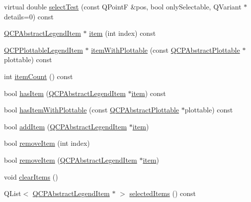 \begin{DoxyCompactItemize}
\item 
virtual double \hyperlink{classQCPLegend_aa3892801051bc7b985e003576df844db}{select\+Test} (const Q\+PointF \&pos, bool only\+Selectable, Q\+Variant $\ast$details=0) const 
\item 
\hyperlink{classQCPAbstractLegendItem}{Q\+C\+P\+Abstract\+Legend\+Item} $\ast$ \hyperlink{classQCPLegend_a454272d7094437beb3278a2294006da5}{item} (int index) const 
\item 
\hyperlink{classQCPPlottableLegendItem}{Q\+C\+P\+Plottable\+Legend\+Item} $\ast$ \hyperlink{classQCPLegend_a5ee80cf83f65e3b6dd386942ee3cc1ee}{item\+With\+Plottable} (const \hyperlink{classQCPAbstractPlottable}{Q\+C\+P\+Abstract\+Plottable} $\ast$plottable) const 
\item 
int \hyperlink{classQCPLegend_a198228e9cdc78d3a3c306fa6763d0404}{item\+Count} () const 
\item 
bool \hyperlink{classQCPLegend_a380dd19eb631592e1ebb9b24cc5b398a}{has\+Item} (\hyperlink{classQCPAbstractLegendItem}{Q\+C\+P\+Abstract\+Legend\+Item} $\ast$\hyperlink{classQCPLegend_a454272d7094437beb3278a2294006da5}{item}) const 
\item 
bool \hyperlink{classQCPLegend_a2eb1d24bdf5658e64962a656303fd61a}{has\+Item\+With\+Plottable} (const \hyperlink{classQCPAbstractPlottable}{Q\+C\+P\+Abstract\+Plottable} $\ast$plottable) const 
\item 
bool \hyperlink{classQCPLegend_a3ab274de52d2951faea45a6d975e6b3f}{add\+Item} (\hyperlink{classQCPAbstractLegendItem}{Q\+C\+P\+Abstract\+Legend\+Item} $\ast$\hyperlink{classQCPLegend_a454272d7094437beb3278a2294006da5}{item})
\item 
bool \hyperlink{classQCPLegend_ac91595c3eaa746fe6321d2eb952c63bb}{remove\+Item} (int index)
\item 
bool \hyperlink{classQCPLegend_a2aea4ec6da2d454dd0b241a254d65082}{remove\+Item} (\hyperlink{classQCPAbstractLegendItem}{Q\+C\+P\+Abstract\+Legend\+Item} $\ast$\hyperlink{classQCPLegend_a454272d7094437beb3278a2294006da5}{item})
\item 
void \hyperlink{classQCPLegend_a24795c7250eb5214fcea16b7217b4dfb}{clear\+Items} ()
\item 
Q\+List$<$ \hyperlink{classQCPAbstractLegendItem}{Q\+C\+P\+Abstract\+Legend\+Item} $\ast$ $>$ \hyperlink{classQCPLegend_ac93eaf236e911d67aa8b88942ef45c5e}{selected\+Items} () const 
\end{DoxyCompactItemize}
